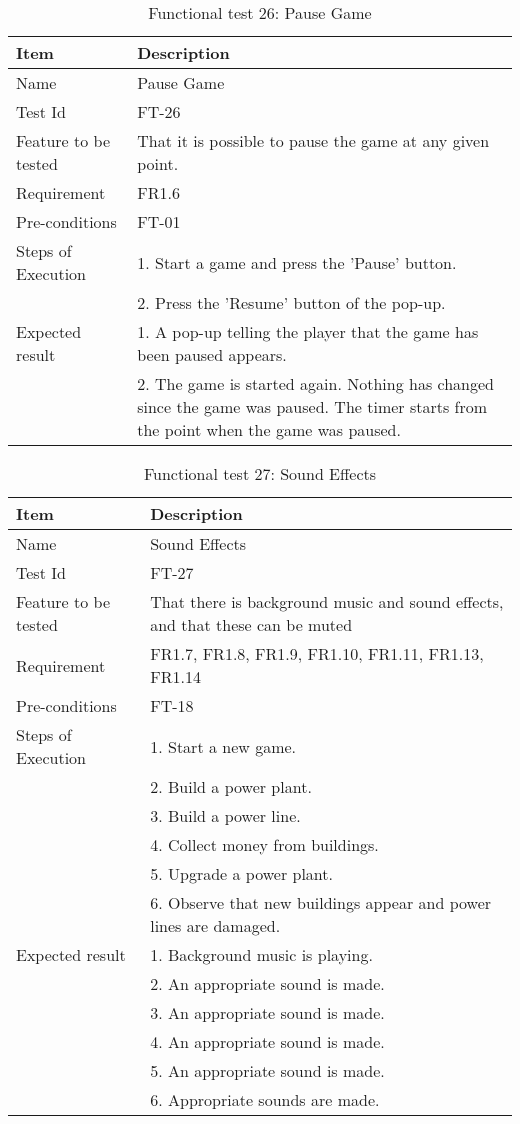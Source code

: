 \begin{table}[H]
\centering
	\begin{tabular}{ l | p{8cm} }
		\hline
		\rowcolor{lightgray}
		{\bf Item} & {\bf Description} \\ \hline
		Name & Pause Game \\ 
		Test Id & FT-26 \\ 
		Feature to be tested & That it is possible to pause the game at any given point. \\ 
		Requirement & FR1.6 \\ 
		Pre-conditions & FT-01 \\ 
		Steps of Execution & 1. Start a game and press the 'Pause' button. \\
		& 2. Press the 'Resume' button of the pop-up. \\
		Expected result & 1. A pop-up telling the player that the game has been paused appears. \\
		& 2. The game is started again. Nothing has changed since the game was paused. The timer starts from the point when the game was paused. \\
		\hline
	\end{tabular}
	\caption{Functional test 26: Pause Game}
\end{table}

\begin{table}[H]
\centering
	\begin{tabular}{ l | p{8cm} }
		\hline
		\rowcolor{lightgray}
		{\bf Item} & {\bf Description} \\ \hline
		Name & Sound Effects \\ 
		Test Id & FT-27 \\ 
		Feature to be tested & That there is background music and sound effects, and that these can be muted \\ 
		Requirement & FR1.7, FR1.8, FR1.9, FR1.10, FR1.11, FR1.13, FR1.14 \\ 
		Pre-conditions & FT-18 \\ 
		Steps of Execution & 1. Start a new game. \\
		& 2. Build a power plant. \\
		& 3. Build a power line. \\
		& 4. Collect money from buildings. \\
		& 5. Upgrade a power plant. \\
		& 6. Observe that new buildings appear and power lines are damaged. \\
		Expected result & 1. Background music is playing. \\
		& 2. An appropriate sound is made. \\
		& 3. An appropriate sound is made. \\
		& 4. An appropriate sound is made. \\
		& 5. An appropriate sound is made. \\
		& 6. Appropriate sounds are made. \\
		\hline
	\end{tabular}
	\caption{Functional test 27: Sound Effects}
\end{table}

